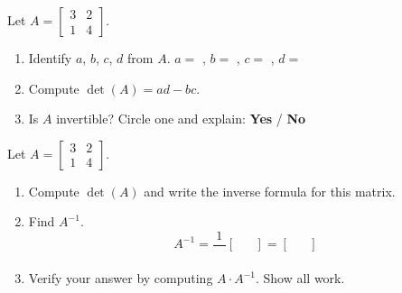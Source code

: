 \documentclass[10pt]{article}
\begin{document}
\namepartnerperiod

\vspace{0.12in}

\begin{tcolorbox}[colback=white, colframe=black!40,
    title=\textbf{Tier R --- Remediate},
    fonttitle=\bfseries, arc=2mm, left=3mm, right=3mm, top=2mm, bottom=2mm]
Let $A = \begin{bmatrix}3&2\\1&4\end{bmatrix}$.

\begin{enumerate}[leftmargin=1.5em, itemsep=8pt]
    \item Identify $a$, $b$, $c$, $d$ from $A$.
          \quad $a = $ \blank{1.5cm}, \; $b = $ \blank{1.5cm},
          \; $c = $ \blank{1.5cm}, \; $d = $ \blank{1.5cm}

    \item Compute $\det(A) = ad - bc$.
          \vspace{0.6in}

    \item Is $A$ invertible? Circle one and explain: \quad \textbf{Yes} \quad / \quad \textbf{No}
          \vspace{0.4in}
\end{enumerate}
\end{tcolorbox}

\vspace{0.1in}

\begin{tcolorbox}[colback=white, colframe=black!40,
    title=\textbf{Tier A --- Approaching Proficiency},
    fonttitle=\bfseries, arc=2mm, left=3mm, right=3mm, top=2mm, bottom=2mm]
Let $A = \begin{bmatrix}3&2\\1&4\end{bmatrix}$.

\begin{enumerate}[leftmargin=1.5em, itemsep=8pt]
    \item Compute $\det(A)$ and write the inverse formula for this matrix.
          \vspace{0.7in}

    \item Find $A^{-1}$.
          \[
              A^{-1} = \dfrac{1}{\phantom{00}}\begin{bmatrix} & \\[10pt] & \end{bmatrix}
              = \begin{bmatrix} & \\[10pt] & \end{bmatrix}
          \]

    \item Verify your answer by computing $A \cdot A^{-1}$. Show all work.
          \vspace{0.9in}
\end{enumerate}
\end{tcolorbox}
\end{document}
